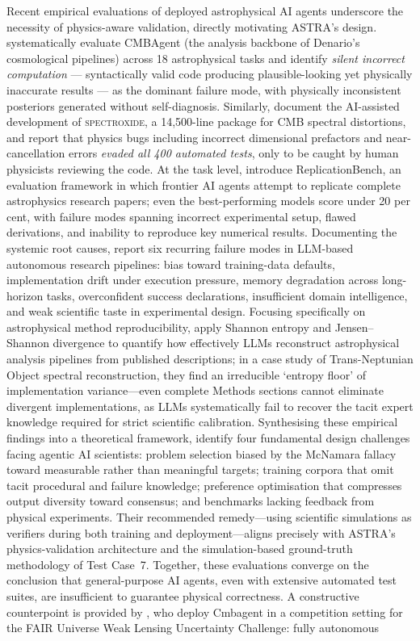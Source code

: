 \documentclass[usenatbib]{rasti}
\begin{document}
Recent empirical evaluations of deployed astrophysical AI agents underscore the necessity of physics-aware validation, directly motivating ASTRA's design. \citet{rawat2026plausible} systematically evaluate CMBAgent (the analysis backbone of Denario's cosmological pipelines) across 18 astrophysical tasks and identify \emph{silent incorrect computation} --- syntactically valid code producing plausible-looking yet physically inaccurate results --- as the dominant failure mode, with physically inconsistent posteriors generated without self-diagnosis. Similarly, \citet{baker2026spectroxide} document the AI-assisted development of \textsc{spectroxide}, a 14,500-line package for CMB spectral distortions, and report that physics bugs including incorrect dimensional prefactors and near-cancellation errors \emph{evaded all 400 automated tests}, only to be caught by human physicists reviewing the code. At the task level, \citet{ye2025replicationbench} introduce ReplicationBench, an evaluation framework in which frontier AI agents attempt to replicate complete astrophysics research papers; even the best-performing models score under 20 per\,cent, with failure modes spanning incorrect experimental setup, flawed derivations, and inability to reproduce key numerical results. Documenting the systemic root causes, \citet{chopra2026llmscientists} report six recurring failure modes in LLM-based autonomous research pipelines: bias toward training-data defaults, implementation drift under execution pressure, memory degradation across long-horizon tasks, overconfident success declarations, insufficient domain intelligence, and weak scientific taste in experimental design. Focusing specifically on astrophysical method reproducibility, \citet{lin2026reconstructability} apply Shannon entropy and Jensen--Shannon divergence to quantify how effectively LLMs reconstruct astrophysical analysis pipelines from published descriptions; in a case study of Trans-Neptunian Object spectral reconstruction, they find an irreducible `entropy floor' of implementation variance---even complete Methods sections cannot eliminate divergent implementations, as LLMs systematically fail to recover the tacit expert knowledge required for strict scientific calibration. Synthesising these empirical findings into a theoretical framework, \citet{bisht2026notbuilt} identify four fundamental design challenges facing agentic AI scientists: problem selection biased by the McNamara fallacy toward measurable rather than meaningful targets; training corpora that omit tacit procedural and failure knowledge; preference optimisation that compresses output diversity toward consensus; and benchmarks lacking feedback from physical experiments. Their recommended remedy---using scientific simulations as verifiers during both training and deployment---aligns precisely with ASTRA's physics-validation architecture and the simulation-based ground-truth methodology of Test Case~7. Together, these evaluations converge on the conclusion that general-purpose AI agents, even with extensive automated test suites, are insufficient to guarantee physical correctness. A constructive counterpoint is provided by \citet{borrett2026cmbagent}, who deploy Cmbagent in a competition setting for the FAIR Universe Weak Lensing Uncertainty Challenge: fully autonomous 
\end{document}
